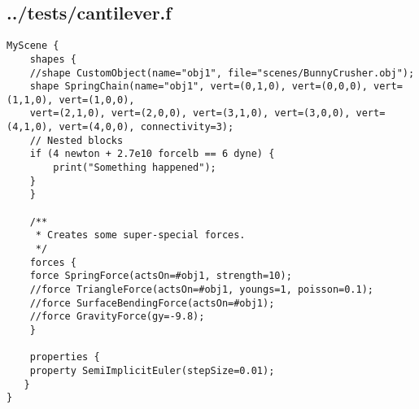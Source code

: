 \subsection*{../tests/cantilever.f}
\begin{lstlisting}
MyScene {
    shapes {
	//shape CustomObject(name="obj1", file="scenes/BunnyCrusher.obj");
	shape SpringChain(name="obj1", vert=(0,1,0), vert=(0,0,0), vert=(1,1,0), vert=(1,0,0), 
	vert=(2,1,0), vert=(2,0,0), vert=(3,1,0), vert=(3,0,0), vert=(4,1,0), vert=(4,0,0), connectivity=3);
	// Nested blocks
	if (4 newton + 2.7e10 forcelb == 6 dyne) {
	    print("Something happened");
	}
    }

    /**
     * Creates some super-special forces.
     */
    forces {
	force SpringForce(actsOn=#obj1, strength=10);
	//force TriangleForce(actsOn=#obj1, youngs=1, poisson=0.1);
	//force SurfaceBendingForce(actsOn=#obj1);
	//force GravityForce(gy=-9.8);
    }

    properties { 
	property SemiImplicitEuler(stepSize=0.01);
   }
}
\end{lstlisting}

